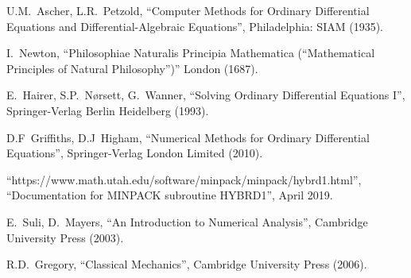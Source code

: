 \documentclass[12pt, twoside]{report}
\theoremstyle{plain}
\theoremstyle{definition}
\theoremstyle{definition}
\begin{document}
\begin{thebibliography}{50}
        U.M.~Ascher, L.R.~Petzold,
        ``Computer Methods for Ordinary Differential Equations and 
        Differential-Algebraic Equations'',
        Philadelphia: SIAM (1935).

        I.~Newton,
        ``Philosophiae Naturalis Principia Mathematica (“Mathematical
        Principles of Natural Philosophy”)'' London (1687).

        E.~Hairer, S.P.~N{\o}rsett, G.~Wanner,
        ``Solving Ordinary Differential Equations I'',
        Springer-Verlag Berlin Heidelberg (1993).

        D.F~Griffiths, D.J~Higham,
        ``Numerical Methods for Ordinary Differential Equations'',
        Springer-Verlag London Limited (2010).

        ``https://www.math.utah.edu/software/minpack/minpack/hybrd1.html'', 
        ``Documentation for MINPACK subroutine HYBRD1'',
        April 2019.

        E.~Suli, D.~Mayers,
        ``An Introduction to Numerical Analysis'',
        Cambridge University Press (2003).

        R.D.~Gregory,
        ``Classical Mechanics'',
        Cambridge University Press (2006).


\end{thebibliography}
\end{document}
